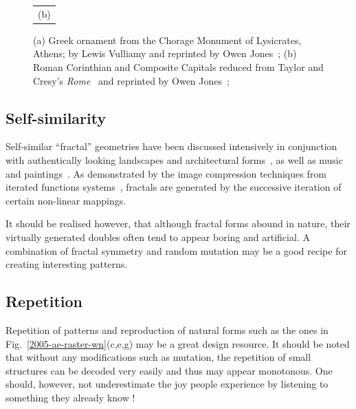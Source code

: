 \documentclass[rmp,amssymb,showpacs,showkeys,12pt,preprint]{revtex4}
\begin{document}
\begin{figure}[hptb]
\begin{center}
\begin{tabular}{c}
(b)
\end{tabular}
\end{center}
   \caption{(a) Greek ornament from the Chorage Monument of Lysicrates, Athens; by Lewis Vulliamy and
reprinted by Owen Jones~\cite{jones-goo};
(b) Roman Corinthian and Composite Capitals reduced from Taylor and Cresy's {\it Rome}~\cite{Tay-Cr} and reprinted by Owen Jones~\cite{jones-goo};
}
   \label{2005-ae-owen}
 \end{figure}


\subsection{Self-similarity}

Self-similar ``fractal'' \cite{mandelbrot-77,mandelbrot-83,falconer1,falconer2}
geometries have been discussed intensively in conjunction with authentically looking landscapes \cite{voss85} and architectural forms~\cite{bovill,jencks},
as well as music~\cite{gard-78} and paintings~\cite{taylor-99}.
As demonstrated by the image compression techniques from iterated functions systems~\cite{barnsley:88},
fractals are generated by the successive iteration of certain non-linear mappings.

It should be realised however, that although fractal forms abound in nature, their virtually generated doubles often tend to appear boring and artificial.
A combination of fractal symmetry and random mutation may be a good recipe for creating interesting patterns.



\subsection{Repetition}

Repetition of patterns and reproduction of natural forms such as the ones in Fig.~\ref{2005-ae-raster-wn}(c,e,g) may be a great design resource.
It should be noted that without any modifications such as mutation, the repetition of small structures can be decoded very easily and thus may appear monotonous.
One should, however, not underestimate the joy people experience by listening to something they already know \cite{feynman-law}!
\end{document}
